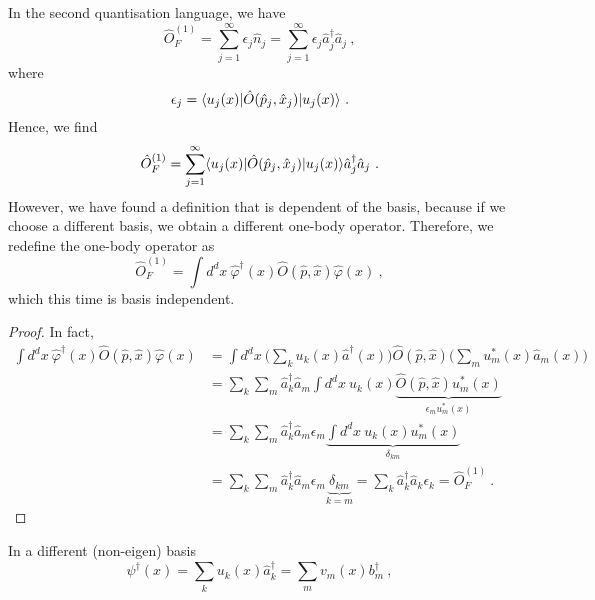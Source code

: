     In the second quantisation language, we have 
    \begin{equation*}
        \hat O^{(1)}_F = \sum_{j=1}^{\infty} \epsilon_j \hat n_j = \sum_{j=1}^{\infty} \epsilon_j \hat a_j^\dagger \hat a_j ~,
    \end{equation*}
    where 
    \begin{equation*}
        \epsilon_j = \langle u_j (x)\vert \hat O (\hat p_j, \hat x_j) \vert u_j(x)\rangle ~.
    \end{equation*}
    Hence, we find
    \begin{equation*}
        \hat O^{(1)}_F = \sum_{j=1}^{\infty} \langle u_j (x)\vert \hat O (\hat p_j, \hat x_j) \vert u_j(x)\rangle \hat a_j^\dagger \hat a_j ~.
    \end{equation*}
    However, we have found a definition that is dependent of the basis, because if we choose a different basis, we obtain a different one-body operator. Therefore, we redefine the one-body operator as
    \begin{equation}\label{basind}
        \hat O^{(1)}_F = \int d^d x ~ \hat \varphi^\dagger (x) \hat O (\hat p, \hat x) \hat \varphi (x) ~,
    \end{equation}
    which this time is basis independent.
    \begin{proof}
        In fact,
        \begin{equation*}
        \begin{aligned}
            \int d^d x ~ \hat \varphi^\dagger (x) \hat O (\hat p, \hat x) \hat \varphi (x) & = \int d^d x ~ \Big ( \sum_k u_k(x) \hat a^\dagger (x) \Big ) \hat O (\hat p, \hat x) \Big ( \sum_m u_m^* (x) \hat a_m (x) \Big ) \\ & = \sum_k \sum_m \hat a_k^\dagger \hat a_m \int d^d x ~ u_k (x) \underbrace{\hat O(\hat p, \hat x) u^*_m (x)}_{\epsilon_m u^*_m (x)} \\ & = \sum_k \sum_m \hat a_k^\dagger \hat a_m \epsilon_m \underbrace{\int d^d x ~ u_k (x) u^*_m (x)}_{\delta_{km}} \\ & = \sum_k \sum_m \hat a_k^\dagger \hat a_m \epsilon_m \underbrace{\delta_{km}}_{k = m} = \sum_k\hat a_k^\dagger \hat a_k \epsilon_k = \hat O^{(1)}_F ~.
        \end{aligned}
        \end{equation*}
    \end{proof}
    In a different (non-eigen) basis
    \begin{equation*}
        \psi^\dagger (x) = \sum_k u_k (x) \hat a^\dagger_k = \sum_m v_m (x) b^\dagger_m ~,
    \end{equation*}
